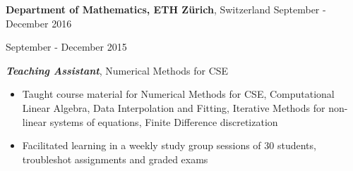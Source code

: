 
\vspace{7pt}

\textbf{Department of Mathematics, ETH Zürich}, Switzerland \hfill September - December 2016

\hfill September - December 2015


\textbf{\textit{Teaching Assistant}}, Numerical Methods for CSE

\begin{itemize}
    \item Taught course material for Numerical Methods for CSE, Computational Linear Algebra, Data Interpolation and Fitting, Iterative Methods for non-linear systems of equations, Finite Difference discretization
    \item Facilitated learning in a weekly study group sessions of 30 students, troubleshot assignments and graded exams
\end{itemize}
